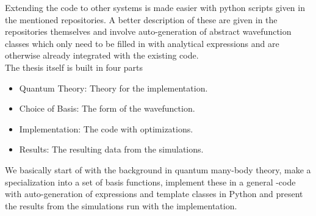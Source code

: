     Extending the code to other systems is made easier with python scripts
    given in the mentioned repositories. A better description of these are
    given in the repositories themselves and involve auto-generation of
    abstract wavefunction classes which only need to be filled in with
    analytical expressions and are otherwise already integrated with the
    existing code. \\
    The thesis itself is built in four parts
        \begin{itemize}
            \item Quantum Theory: Theory for the implementation.
            \item Choice of Basis: The form of the wavefunction.
            \item Implementation: The code with optimizations.
            \item Results: The resulting data from the simulations.
        \end{itemize}
    We basically start of with the background in quantum many-body theory, make
    a specialization into a set of basis functions, implement these in a
    general \CC-code with auto-generation of expressions and template classes
    in Python and present the results from the simulations run with the
    implementation.
